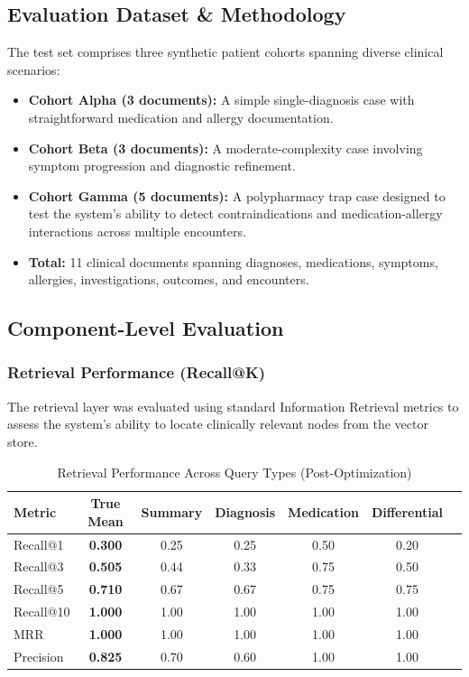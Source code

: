 \subsection{Evaluation Dataset \& Methodology}
The test set comprises three synthetic patient cohorts spanning diverse clinical scenarios:
\begin{itemize}
    \item \textbf{Cohort Alpha (3 documents):} A simple single-diagnosis case with straightforward medication and allergy documentation.
    \item \textbf{Cohort Beta (3 documents):} A moderate-complexity case involving symptom progression and diagnostic refinement.
    \item \textbf{Cohort Gamma (5 documents):} A polypharmacy trap case designed to test the system's ability to detect contraindications and medication-allergy interactions across multiple encounters.
    \item \textbf{Total:} 11 clinical documents spanning diagnoses, medications, symptoms, allergies, investigations, outcomes, and encounters.
\end{itemize}

\subsection{Component-Level Evaluation}

\subsubsection{Retrieval Performance (Recall@K)}
The retrieval layer was evaluated using standard Information Retrieval metrics to assess the system's ability to locate clinically relevant nodes from the vector store.

\begin{table}[H]
\centering
\caption{Retrieval Performance Across Query Types (Post-Optimization)}
\label{tab:retrieval_performance}
\begin{tabular}{lcccccc}
\hline
\textbf{Metric} & \textbf{True Mean} & \textbf{Summary} & \textbf{Diagnosis} & \textbf{Medication} & \textbf{Differential} \\
\hline
Recall@1  & \textbf{0.300} & 0.25 & 0.25 & 0.50 & 0.20 \\
Recall@3  & \textbf{0.505} & 0.44 & 0.33 & 0.75 & 0.50 \\
Recall@5  & \textbf{0.710} & 0.67 & 0.67 & 0.75 & 0.75 \\
Recall@10 & \textbf{1.000} & 1.00 & 1.00 & 1.00 & 1.00 \\
\hline
MRR       & \textbf{1.000} & 1.00 & 1.00 & 1.00 & 1.00 \\
Precision & \textbf{0.825} & 0.70 & 0.60 & 1.00 & 1.00 \\
\hline
\end{tabular}
\end{table}

